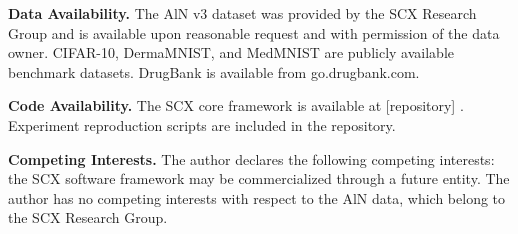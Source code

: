 \documentclass[12pt,a4paper]{article}
\begin{document}
\textbf{Data Availability.}
The AlN v3 dataset was provided by the SCX Research Group and is available upon reasonable request and with permission of the data owner. CIFAR-10, DermaMNIST, and MedMNIST are publicly available benchmark datasets. DrugBank is available from go.drugbank.com.

\textbf{Code Availability.}
The SCX core framework is available at [repository] . Experiment reproduction scripts are included in the repository.

\textbf{Competing Interests.}
The author declares the following competing interests: the SCX software framework may be commercialized through a future entity. The author has no competing interests with respect to the AlN data, which belong to the SCX Research Group.
\end{document}
